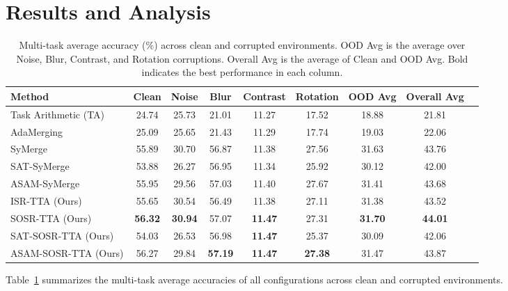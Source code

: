 \documentclass{article}
\theoremstyle{plain}
\theoremstyle{definition}
\theoremstyle{remark}
\begin{document}
\section{Results and Analysis}
\label{sec:results}

\begin{table}[t]
\caption{Multi-task average accuracy (\%) across clean and corrupted environments. OOD Avg is the average over Noise, Blur, Contrast, and Rotation corruptions. Overall Avg is the average of Clean and OOD Avg. Bold indicates the best performance in each column.}
\label{tab:results}
\vskip 0.15in
\begin{center}
\begin{small}
\begin{sc}
\begin{tabular}{lcccccccc}
\toprule
Method & Clean & Noise & Blur & Contrast & Rotation & OOD Avg & Overall Avg \\
\midrule
Task Arithmetic (TA) & 24.74 & 25.73 & 21.01 & 11.27 & 17.52 & 18.88 & 21.81 \\
AdaMerging           & 25.09 & 25.65 & 21.43 & 11.29 & 17.74 & 19.03 & 22.06 \\
SyMerge              & 55.89 & 30.70 & 56.87 & 11.38 & 27.56 & 31.63 & 43.76 \\
SAT-SyMerge          & 53.88 & 26.27 & 56.95 & 11.34 & 25.92 & 30.12 & 42.00 \\
ASAM-SyMerge         & 55.95 & 29.56 & 57.03 & 11.40 & 27.67 & 31.41 & 43.68 \\
\midrule
ISR-TTA (Ours)       & 55.65 & 30.54 & 56.49 & 11.38 & 27.11 & 31.38 & 43.52 \\
SOSR-TTA (Ours)      & \textbf{56.32} & \textbf{30.94} & 57.07 & \textbf{11.47} & 27.31 & \textbf{31.70} & \textbf{44.01} \\
SAT-SOSR-TTA (Ours)  & 54.03 & 26.53 & 56.98 & \textbf{11.47} & 25.37 & 30.09 & 42.06 \\
ASAM-SOSR-TTA (Ours) & 56.27 & 29.84 & \textbf{57.19} & \textbf{11.47} & \textbf{27.38} & 31.47 & 43.87 \\
\bottomrule
\end{tabular}
\end{sc}
\end{small}
\end{center}
\vskip -0.1in
\end{table}

Table~\ref{tab:results} summarizes the multi-task average accuracies of all configurations across clean and corrupted environments.
\end{document}
